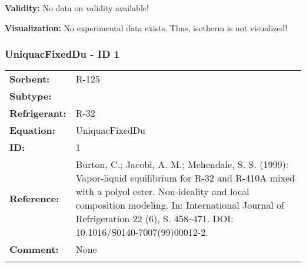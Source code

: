 \textbf{Validity:}
\newline
No data on validity available!
\newline

\textbf{Visualization:}
%
\newline
No experimental data exists. Thus, isotherm is not visualized!
%

\FloatBarrier
\newpage
\subsubsection{UniquacFixedDu - ID 1}
%
\begin{tabular}[l]{|lp{11.5cm}|}
\hline
\addlinespace

\textbf{Sorbent:} & R-125 \\
\textbf{Subtype:} &  \\
\textbf{Refrigerant:} & R-32 \\
\textbf{Equation:} & UniquacFixedDu \\
\textbf{ID:} & 1 \\
\textbf{Reference:} & Burton, C.; Jacobi, A. M.; Mehendale, S. S. (1999): Vapor-liquid equilibrium for R-32 and R-410A mixed with a polyol ester. Non-ideality and local composition modeling. In: International Journal of Refrigeration 22 (6), S. 458–471. DOI: 10.1016/S0140-7007(99)00012-2. \\
\textbf{Comment:} & None \\

\addlinespace
\hline
\end{tabular}
\newline

